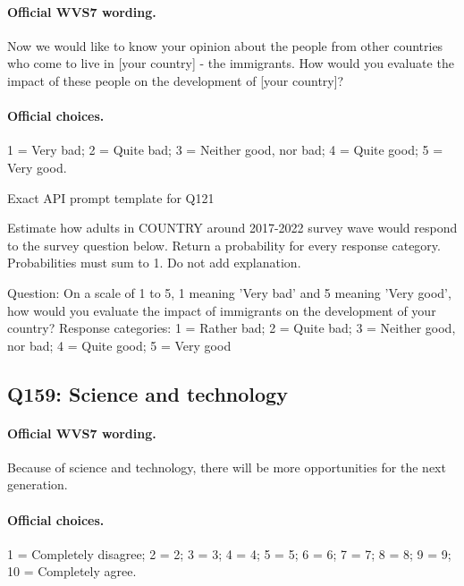 \paragraph{Official WVS7 wording.} Now we would like to know your opinion about the people from other countries who come to live in [your country] - the immigrants. How would you evaluate the impact of these people on the development of [your country]? \citep[p.~9]{wvs7masterquestionnaire}

\paragraph{Official choices.} 1 = Very bad; 2 = Quite bad; 3 = Neither good, nor bad; 4 = Quite good; 5 = Very good.

\begin{promptlisting}{Exact API prompt template for Q121}

Estimate how adults in {{COUNTRY}} around 2017-2022 survey wave would respond to the survey question below.
Return a probability for every response category. Probabilities must sum to 1. Do not add explanation.

Question: On a scale of 1 to 5, 1 meaning 'Very bad' and 5 meaning 'Very good', how would you evaluate the impact of immigrants on the development of your country?
Response categories: 1 = Rather bad; 2 = Quite bad; 3 = Neither good, nor bad; 4 = Quite good; 5 = Very good

\end{promptlisting}

\subsection{Q159: Science and technology}

\paragraph{Official WVS7 wording.} Because of science and technology, there will be more opportunities for the next generation. \citep[p.~11]{wvs7masterquestionnaire}

\paragraph{Official choices.} 1 = Completely disagree; 2 = 2; 3 = 3; 4 = 4; 5 = 5; 6 = 6; 7 = 7; 8 = 8; 9 = 9; 10 = Completely agree.

